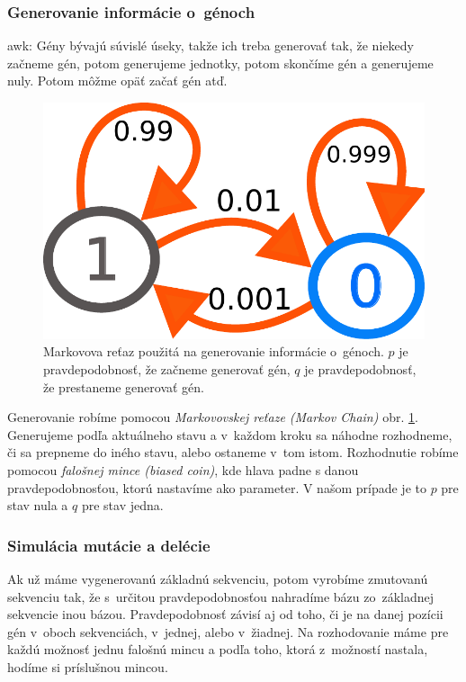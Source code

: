 \subsubsection{Generovanie informácie o~génoch}
\todo awk:
Gény bývajú súvislé úseky, takže ich treba generovať tak, že niekedy začneme gén, potom generujeme jednotky, potom skončíme gén a generujeme nuly. Potom môžme opäť začať gén atď.

\begin{figure}[htp]
    \centering
    \includegraphics[width=.7\textwidth]{images/markov_chain}
    \caption[Markovova reťaz použitá na generovanie informácie o~génoch]{Markovova reťaz použitá na generovanie informácie o~génoch. $p$ je pravdepodobnosť, že začneme generovať gén, $q$ je pravdepodobnosť, že prestaneme generovať gén.}
    \label{fig:markov-chain}
\end{figure}

Generovanie robíme pomocou \textit{Markovovskej reťaze (Markov Chain)} obr. \ref{fig:markov-chain}. Generujeme podľa aktuálneho stavu a v~každom kroku sa náhodne rozhodneme, či sa prepneme do iného stavu, alebo ostaneme v~tom istom. Rozhodnutie robíme pomocou \textit{falošnej mince (biased coin)}, kde hlava padne s danou pravdepodobnosťou, ktorú nastavíme ako parameter. V našom prípade je to $p$ pre stav nula a $q$ pre stav jedna.


\subsubsection{Simulácia mutácie a delécie}

Ak už máme vygenerovanú základnú sekvenciu, potom vyrobíme zmutovanú sekvenciu tak, že s~určitou pravdepodobnosťou nahradíme bázu zo~základnej sekvencie inou bázou. Pravdepodobnosť závisí aj od toho, či je na danej pozícii gén v~oboch sekvenciách, v~jednej, alebo v~žiadnej. Na rozhodovanie máme pre každú možnosť jednu falošnú mincu a podľa toho, ktorá z~možností nastala, hodíme si príslušnou mincou.

